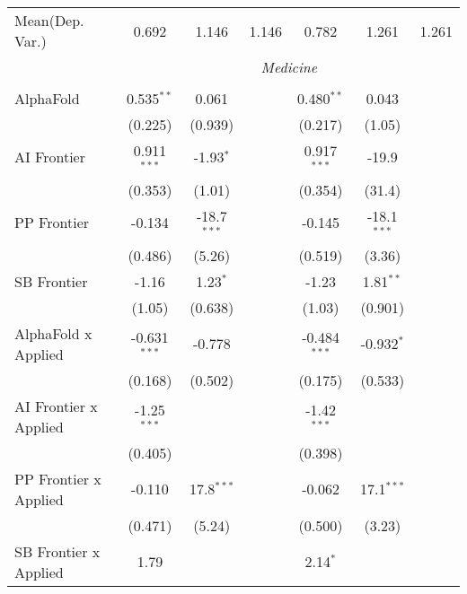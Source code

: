 \begin{tabular}{lcccccc}
Mean(Dep. Var.) & 0.692 & 1.146 & 1.146 & 0.782 & 1.261 & 1.261 \\
 & \multicolumn{6}{c}{\textit{Medicine}} \\ \\
   AlphaFold                      & 0.535$^{**}$   & 0.061         &               & 0.480$^{**}$   & 0.043         &   \\   
                                  & (0.225)        & (0.939)       &               & (0.217)        & (1.05)        &   \\   
   AI Frontier                    & 0.911$^{***}$  & -1.93$^{*}$   &               & 0.917$^{***}$  & -19.9         &   \\   
                                  & (0.353)        & (1.01)        &               & (0.354)        & (31.4)        &   \\   
   PP Frontier                    & -0.134         & -18.7$^{***}$ &               & -0.145         & -18.1$^{***}$ &   \\   
                                  & (0.486)        & (5.26)        &               & (0.519)        & (3.36)        &   \\   
   SB Frontier                    & -1.16          & 1.23$^{*}$    &               & -1.23          & 1.81$^{**}$   &   \\   
                                  & (1.05)         & (0.638)       &               & (1.03)         & (0.901)       &   \\   
   AlphaFold x Applied            & -0.631$^{***}$ & -0.778        &               & -0.484$^{***}$ & -0.932$^{*}$  &   \\   
                                  & (0.168)        & (0.502)       &               & (0.175)        & (0.533)       &   \\   
   AI Frontier x Applied          & -1.25$^{***}$  &               &               & -1.42$^{***}$  &               &   \\   
                                  & (0.405)        &               &               & (0.398)        &               &   \\   
   PP Frontier x Applied          & -0.110         & 17.8$^{***}$  &               & -0.062         & 17.1$^{***}$  &   \\   
                                  & (0.471)        & (5.24)        &               & (0.500)        & (3.23)        &   \\   
   SB Frontier x Applied          & 1.79           &               &               & 2.14$^{*}$     &               &   \\   

\end{tabular}
